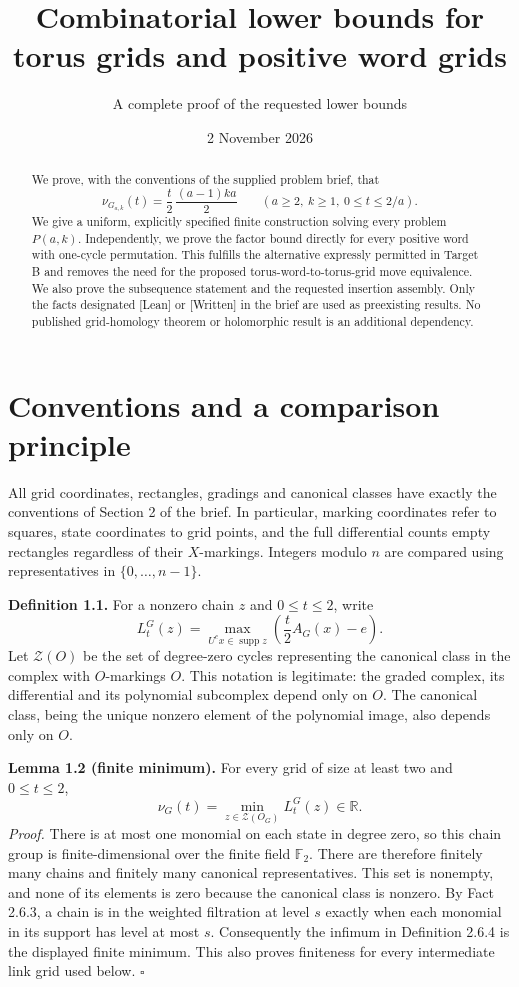 \documentclass[11pt,a4paper]{article}
\title{Combinatorial lower bounds for torus grids and positive word grids}
\author{A complete proof of the requested lower bounds}
\date{2 November 2026}
\begin{document}
\maketitle

\begin{abstract}
We prove, with the conventions of the supplied problem brief, that
\[
\nu_{G_{a,k}}(t)=\frac{t}{2}\,\frac{(a-1)ka}{2}
\qquad(a\ge2,\ k\ge1,\ 0\le t\le2/a).
\]
We give a uniform, explicitly specified finite construction solving every
problem $P(a,k)$. Independently, we prove the factor bound directly for every
positive word with one-cycle permutation. This fulfills the alternative
expressly permitted in Target B and removes the need for the proposed
torus-word-to-torus-grid move equivalence. We also prove the subsequence
statement and the requested insertion assembly. Only the facts designated
[Lean] or [Written] in the brief are used as preexisting results. No published
grid-homology theorem or holomorphic result is an additional dependency.
\end{abstract}

\section{Conventions and a comparison principle}

All grid coordinates, rectangles, gradings and canonical classes have exactly
the conventions of Section 2 of the brief. In particular, marking coordinates
refer to squares, state coordinates to grid points, and the full differential
counts empty rectangles regardless of their $X$-markings. Integers modulo $n$
are compared using representatives in $\{0,\ldots,n-1\}$.

\textbf{Definition 1.1.}
For a nonzero chain $z$ and $0\le t\le2$, write
\[
L_t^G(z)=\max_{U^e x\in\operatorname{supp}z}
\left(\frac{t}{2}A_G(x)-e\right).
\]
Let $\mathcal Z(O)$ be the set of degree-zero cycles representing the canonical
class in the complex with $O$-markings $O$. This notation is legitimate:
the graded complex, its differential and its polynomial subcomplex depend
only on $O$. The canonical class, being the unique nonzero element of the
polynomial image, also depends only on $O$.

\textbf{Lemma 1.2 (finite minimum).}
For every grid of size at least two and $0\le t\le2$,
\[
\nu_G(t)=\min_{z\in\mathcal Z(O_G)}L_t^G(z)\in\mathbb R.
\]
\textit{Proof.}
There is at most one monomial on each state in degree zero, so this chain
group is finite-dimensional over the finite field $\mathbb F_2$. There are
therefore finitely many chains and finitely many canonical representatives.
This set is nonempty, and none of its elements is zero because the canonical
class is nonzero. By Fact 2.6.3, a chain is in the weighted filtration at level
$s$ exactly when each monomial in its support has level at most $s$.
Consequently the infimum in Definition 2.6.4 is the displayed finite
minimum. This also proves finiteness for every intermediate link grid used
below. $\square$
\end{document}
